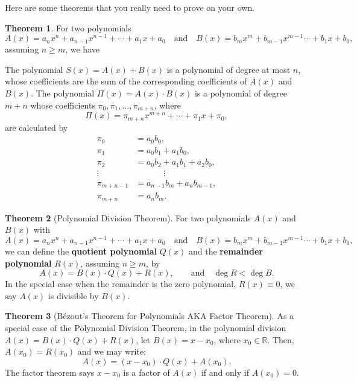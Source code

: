 \documentclass[12pt,a4paper]{memoir}
\theoremstyle{definition}
\newtheorem{theorem}{Theorem}
\begin{document}
	Here are some theorems that you really need to prove on your own.
	
	
	\begin{theorem}
		For two polynomials
		\[A(x)=a_nx^n+a_{n-1}x^{n-1}+\cdots+a_1x+a_0 \quad \text{and} \quad B(x)=b_mx^m+b_{m-1}x^{m-1}\cdots+b_1x+b_0,\]
		assuming $n\geq m$, we have
		\begin{tasks}
			\task The polynomial $S(x)=A(x)+B(x)$ is a polynomial of degree at most $n$, whose coefficients are the sum of the corresponding coefficients of $A(x)$ and $B(x)$.
			\task The polynomial $\Pi(x) = A(x) \cdot B(x)$ is a polynomial of degree $m+n$ whose coefficients $\pi_0,\pi_1,\dots,\pi_{m+n}$, where
			\[\Pi(x) = \pi_{m+n}x^{m+n} + \cdots + \pi_1x+\pi_0,\]
			are calculated by
			\begin{align*}
				\pi_0 &= a_0b_0,\\
				\pi_1 &= a_0b_1 + a_1b_0,\\
				\pi_2 &= a_0b_2+a_1b_1+a_2b_0,\\
				\vdots &\phantom{=} \qquad \vdots\\
				\pi_{m+n-1} &= a_{n-1}b_m + a_nb_{m-1},\\
				\pi_{m+n} &= a_nb_m.
			\end{align*}
		\end{tasks}
	\end{theorem}
	
	
	\begin{theorem}[Polynomial Division Theorem]
		For two polynomials $A(x)$ and $B(x)$ with
		\[A(x)=a_nx^n+a_{n-1}x^{n-1}+\cdots+a_1x+a_0 \quad \text{and} \quad B(x)=b_mx^m+b_{m-1}x^{m-1}\cdots+b_1x+b_0,\]
		we can define the \textbf{quotient polynomial} $Q(x)$ and the \textbf{remainder polynomial} $R(x)$, assuming $n\geq m$, by
		\[A(x) = B(x) \cdot Q(x) + R(x), \qquad \text{and} \quad \deg R < \deg B.\]
		In the special case when the remainder is the zero polynomial, $R(x) \equiv 0$, we say $A(x)$ is divisible by $B(x)$. 
	\end{theorem}
	
	
	\begin{theorem}[Bézout's Theorem for Polynomials AKA Factor Theorem]
		As a special case of the Polynomial Division Theorem, in the polynomial division $A(x) = B(x) \cdot Q(x) + R(x)$, let $B(x)=x-x_0$, where $x_0 \in\mathbb R$. Then, $A(x_0)=R(x_0)$ and we may write:
		\[A(x)=(x-x_0)\cdot Q(x) + A(x_0).\]
		The factor theorem says $x-x_0$ is a factor of $A(x)$ if and only if $A(x_0)=0$.
	\end{theorem}
	
\end{document}
